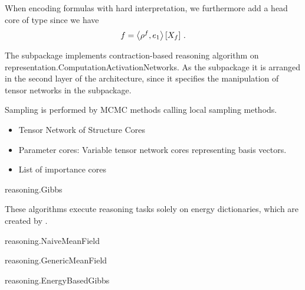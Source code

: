 When encoding formulas with hard interpretation, we furthermore add a head core of type  since we have
\[ {f} = \left\langle \rho^{f},e_1\right\rangle \left[ X_{f} \right] \, . \]






\label{sec:implementationReasoning}


The \spreasoning subpackage implements contraction-based reasoning algorithm on representation.ComputationActivationNetworks.
As the \sprepresentation subpackage it is arranged in the second layer of the \tnreason architecture, since it specifies the manipulation of tensor networks in the \spengine subpackage.


Sampling is performed by MCMC methods calling local sampling methods.

\begin{itemize}
    \item Tensor Network of Structure Cores
    \item Parameter cores: Variable tensor network cores representing basis vectors.
    \item List of importance cores
\end{itemize}

\begin{centeredcode}
    reasoning.Gibbs
\end{centeredcode}


These algorithms execute reasoning tasks solely on energy dictionaries, which are created by .

\begin{centeredcode}
    reasoning.NaiveMeanField
\end{centeredcode}

\begin{centeredcode}
    reasoning.GenericMeanField
\end{centeredcode}

\begin{centeredcode}
    reasoning.EnergyBasedGibbs
\end{centeredcode}




\label{sec:implementationApplication}

